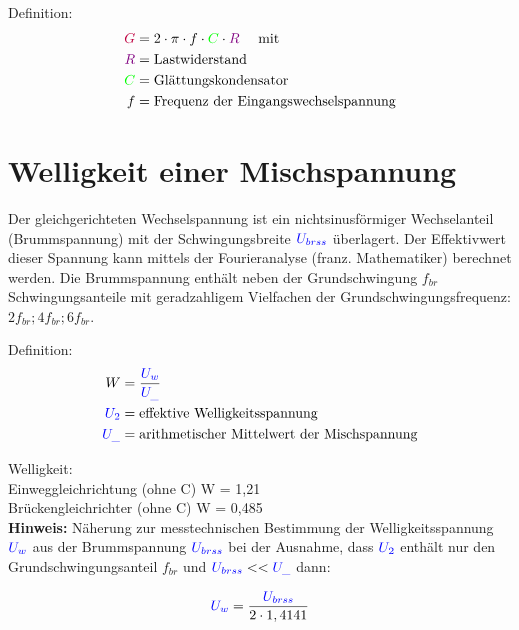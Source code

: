 \documentclass[11pt,a4paper,titlepage,parskip=half]{scrreprt}
\begin{document}
           Definition:
           \begin{align*}
           \textcolor{purple}{G} &= 2 \cdot \pi \cdot f \cdot \textcolor{green}{C} \cdot \textcolor{violet}{R} \quad \text{ mit }\\
           \textcolor{violet}{R} &= \text{Lastwiderstand} \\
           \textcolor{green}{C} &= \text{Glättungskondensator}\\
           f &= \text{Frequenz der Eingangswechselspannung}
           \end{align*}
           \section{Welligkeit einer Mischspannung}
           Der  gleichgerichteten  Wechselspannung  ist  ein  nichtsinusförmiger  Wechselanteil  (Brummspannung)  mit  der  Schwingungsbreite  $\textcolor{blue}{U_{brss}}$ überlagert.  Der  Effektivwert  dieser  Spannung  kann  mittels  der  Fourieranalyse  (franz.  Mathematiker)  berechnet  werden.  Die  Brummspannung  enthält neben  der  Grundschwingung  $f_{br}$ Schwingungsanteile  mit  geradzahligem Vielfachen  der  Grundschwingungsfrequenz: $2f_{br}; 4f_{br}; 6f_{br}$.

           Definition:
           \begin{align*}
           W &= \frac{\textcolor{blue}{U_w}}{\textcolor{blue}{U_{\_}}}\\
           \textcolor{blue}{U_2} &= \text{effektive Welligkeitsspannung}\\
           \textcolor{blue}{U_{\_}} &= \text{arithmetischer Mittelwert der Mischspannung} 
           \end{align*}
           
           
           Welligkeit:\\
           Einweggleichrichtung (ohne C)   W = 1,21\\
           Brückengleichrichter  (ohne C)    W = 0,485\\
           
           \textbf{Hinweis:} Näherung  zur messtechnischen Bestimmung  der  Welligkeitsspannung $\textcolor{blue}{U_w}$ aus  der  Brummspannung $\textcolor{blue}{U_{brss}}$ bei der Ausnahme, dass $\textcolor{blue}{U_2}$ enthält nur den Grundschwingungsanteil $f_{br}$ und $\textcolor{blue}{U_{brss}} << \textcolor{blue}{U_{\_}}$ dann:
           
           \begin{equation*}
           \textcolor{blue}{U_w} = \frac{\textcolor{blue}{U_{brss}}}{ 2 \cdot 1,4141}
           \end{equation*}
 
\end{document}

